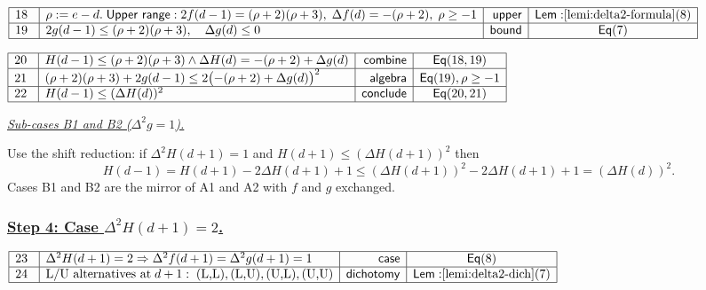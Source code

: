\documentclass[11pt,reqno]{amsart}
\begin{document}
\nointerlineskip \noindent $%
\begin{array}{|m{0.5cm}|l|r|c|}
\hline
18 & \rho :=e-d.\;\mathsf{Upper\ range:}\;2f(d-1)=(\rho +2)(\rho
+3),\;\Delta f(d)=-(\rho +2),\;\rho \geq -1 & \mathsf{upper} & \mathsf{Lem:}%
\ref{lemi:delta2-formula}(8) \\ \hline
19 & 2g(d-1)\leq (\rho +2)(\rho +3),\quad \Delta g(d)\leq 0 & \mathsf{bound}
& \mathsf{Eq}(7) \\ \hline
\end{array}%
$

\nointerlineskip\noindent $%
\begin{array}{|m{0.5cm}|l|r|c|}
\hline
20 & H(d-1)\leq (\rho +2)(\rho +3)\wedge \Delta H(d)=-(\rho +2)+\Delta g(d)
& \mathsf{combine} & \mathsf{Eq}(18,19) \\ \hline
21 & (\rho +2)(\rho +3)+2g(d-1)\leq 2\bigl(-(\rho +2)+\Delta g(d)\bigr)^{2}
& \mathsf{algebra} & \mathsf{Eq}(19),\rho \geq -1 \\ \hline
22 & H(d-1)\leq (\Delta H(d))^{2} & \mathsf{conclude} & \mathsf{Eq}(20,21)
\\ \hline
\end{array}%
$

\bigskip%

\noindent \underline{\textit{Sub-cases B1 and B2 ($\Delta ^{2}g=1$).} }

\medskip%

\bigskip 

\noindent%
Use the shift reduction: if $\Delta ^{2}H(d+1)=1$ and $H(d+1)\leq (\Delta
H(d+1))^{2}$ then 
\begin{equation*}
H(d-1)=H(d+1)-2\Delta H(d+1)+1\leq (\Delta H(d+1))^{2}-2\Delta
H(d+1)+1=(\Delta H(d))^{2}.
\end{equation*}%
\noindent%
Cases B1 and B2 are the mirror of A1 and A2 with $f$ and $g$ exchanged.

\subsubsection*{\protect\underline{Step 4: Case $\Delta ^{2}H(d+1)=2$.}}

\noindent$%
\begin{array}{|m{0.5cm}|l|r|c|}
\hline
23 & \Delta^{2}H(d+1)=2\Rightarrow\Delta^{2}f(d+1)=\Delta^{2}g(d+1)=1 & 
\mathsf{case} & \mathsf{Eq}(8) \\ \hline
24 & \text{L/U\ alternatives at}\;d+1:\;\text{(L,L)},\text{(L,U)},\text{(U,L)%
},\text{(U,U)} & \mathsf{dichotomy} & \mathsf{Lem:}\ref{lemi:delta2-dich}(7)
\\ \hline
\end{array}%
$
\end{document}
